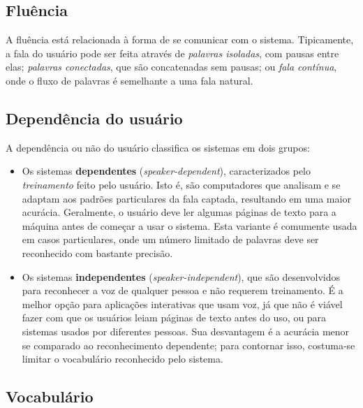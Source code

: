 \subsection{Fluência}

A fluência está relacionada à forma de se comunicar com o sistema. Tipicamente, a fala do usuário pode ser feita através de \emph{palavras isoladas}, com pausas entre elas; \emph{palavras conectadas}, que são concatenadas sem pausas; ou \emph{fala contínua}, onde o fluxo de palavras é semelhante a uma fala natural.


\subsection{Dependência do usuário}

A dependência ou não do usuário classifica os sistemas em dois grupos:

\begin{itemize}
\item Os sistemas \textbf{dependentes} (\textit{speaker-dependent}), caracterizados pelo \emph{treinamento} feito pelo usuário. Isto é, são computadores que analisam e se adaptam aos padrões particulares da fala captada, resultando em uma maior acurácia. Geralmente, o usuário deve ler algumas páginas de texto para a máquina antes de começar a usar o sistema. Esta variante é comumente usada em casos particulares, onde um número limitado de palavras deve ser reconhecido com bastante precisão.

\item Os sistemas \textbf{independentes} (\textit{speaker-independent}), que são desenvolvidos para reconhecer a voz de qualquer pessoa e não requerem treinamento. É a melhor opção para aplicações interativas que usam voz, já que não é viável fazer com que os usuários leiam páginas de texto antes do uso, ou para sistemas usados por diferentes pessoas. Sua desvantagem é a acurácia menor se comparado ao reconhecimento dependente; para contornar isso, costuma-se limitar o vocabulário reconhecido pelo sistema.
\end{itemize}


\subsection{Vocabulário}

